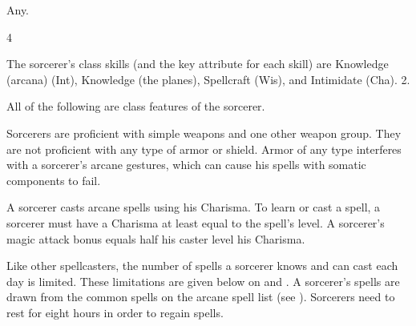  Any.

 4

The sorcerer's class skills (and the key attribute for each skill) are Knowledge (arcana) (Int), Knowledge (the planes), Spellcraft (Wis), and Intimidate (Cha).
 2.

All of the following are class features of the sorcerer.

   Sorcerers are proficient with simple weapons  and one other weapon group.  They are not proficient with any type of armor or shield. Armor of any type interferes with a sorcerer's arcane gestures, which can cause his spells with somatic components to fail.

 A sorcerer casts arcane spells using his Charisma.  To learn or cast a spell, a sorcerer must have a Charisma at least equal to the spell's level. A sorcerer's magic attack bonus equals half his caster level \add his Charisma.

Like other spellcasters, the number of spells a sorcerer knows and can cast each day is limited. These limitations are given below on  and . A sorcerer's spells are drawn from the common spells on the arcane spell list (see ). Sorcerers need to rest for eight hours in order to regain spells.

